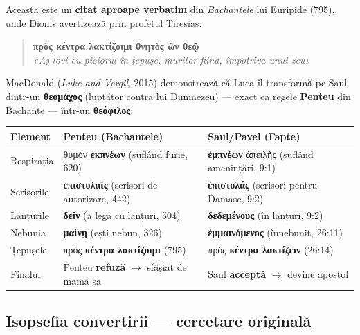 \documentclass[12pt,a4paper,twoside,openany]{book}
\begin{document}
Aceasta este un \textbf{citat aproape verbatim} din \textit{Bachantele} lui Euripide (795), unde Dionis avertizează prin profetul Tiresias:

\begin{quote}
\textbf{πρὸς κέντρα λακτίζοιμι θνητὸς ὢν θεῷ}\\
\textit{«Aș lovi cu piciorul în țepușe, muritor fiind, împotriva unui zeu»}
\end{quote}

MacDonald (\textit{Luke and Vergil}, 2015) demonstrează că Luca îl transformă pe Saul dintr-un \textbf{θεομάχος} (luptător contra lui Dumnezeu) --- exact ca regele \textbf{Penteu} din Bachante --- într-un \textbf{θεόφιλος}:

\begin{center}
\footnotesize
\begin{tabular}{L{2cm}L{5cm}L{5.5cm}}
\toprule
{}
\textbf{Element} & \textbf{Penteu (Bachantele)} & \textbf{Saul/Pavel (Fapte)} \\
\midrule
Respirația & θυμὸν \textbf{ἐκπνέων} (suflând furie, 620) & \textbf{ἐμπνέων} ἀπειλῆς (suflând amenințări, 9:1) \\
Scrisorile & \textbf{ἐπιστολαῖς} (scrisori de autorizare, 442) & \textbf{ἐπιστολάς} (scrisori pentru Damasc, 9:2) \\
Lanțurile & \textbf{δεῖν} (a lega cu lanțuri, 504) & \textbf{δεδεμένους} (în lanțuri, 9:2) \\
Nebunia & \textbf{μαίνῃ} (ești nebun, 326) & \textbf{ἐμμαινόμενος} (înnebunit, 26:11) \\
Țepușele & πρὸς \textbf{κέντρα λακτίζοιμι} (795) & πρὸς \textbf{κέντρα λακτίζειν} (26:14) \\
Finalul & Penteu \textbf{refuză} $\rightarrow$ sfâșiat de mama sa & Saul \textbf{acceptă} $\rightarrow$ devine apostol \\
\bottomrule
\end{tabular}
\end{center}
\normalsize

\subsection*{Isopsefia convertirii --- cercetare originală}
\end{document}
